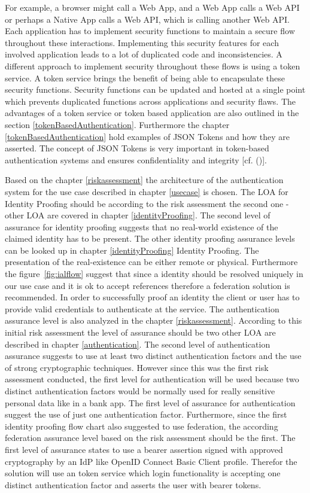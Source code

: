 For example, a browser might call a Web App, and a Web App calls a Web API or perhaps a Native App calls a Web API, which is calling another Web API. Each application has to implement security functions to maintain a secure flow throughout these interactions. Implementing this security features for each involved application leads to a lot of duplicated code and inconsistencies. A different approach to implement security throughout these flows is using a token service. A token service brings the benefit of being able to encapsulate these security functions. Security functions can be updated and hosted at a single point which prevents duplicated functions across applications and security flaws. The advantages of a token service or token based application are also outlined in the section \ref{tokenBasedAuthentication}. Furthermore the chapter \ref{tokenBasedAuthentication} hold examples of JSON Tokens and how they are asserted. The concept of JSON Tokens is very important in token-based authentication systems and ensures confidentiality and integrity [cf. (\cite{Sakimura:2014:OpenIDConnect})].

Based on the chapter \ref{riskassessment} the architecture of the authentication system for the use case described in chapter \ref{usecase} is chosen. The LOA for Identity Proofing should be according to the risk assessment the second one - other LOA are covered in chapter \ref{identityProofing}. The second level of assurance for identity proofing suggests that no real-world existence of the claimed identity has to be present. The other identity proofing assurance levels can be looked up in chapter \ref{identityProofing} Identity Proofing. The presentation of the real-existence can be either remote or physical. Furthermore the figure~\ref{fig:ialflow} suggest that since a identity should be resolved uniquely in our use case and it is ok to accept references therefore a federation solution is recommended. In order to successfully proof an identity the client or user has to provide valid credentials to authenticate at the service. The  authentication assurance level is also analyzed in the chapter \ref{riskassessment}. According to this initial risk assessment the level of assurance should be two other LOA are described in chapter \ref{authentication}. The second level of authentication assurance suggests to use at least two distinct authentication factors and the use of strong cryptographic techniques. However since this was the first risk assessment conducted, the first level for authentication will be used because two distinct authentication factors would be normally used for really sensitive personal data like in a bank app. The first level of assurance for authentication suggest the use of just one authentication factor. Furthermore, since the first identity proofing flow chart also suggested to use federation, the according federation assurance level based on the risk assessment should be the first. The first level of assurance states to use a bearer assertion signed with approved cryptography by an IdP like OpenID Connect Basic Client profile. Therefor the solution will use an token service which login functionality is  accepting one distinct authentication factor and asserts the user with bearer tokens. 



